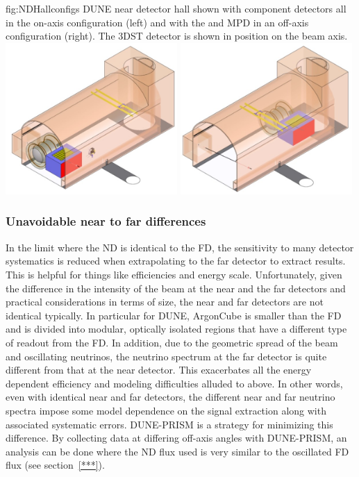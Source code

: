 \begin{dunefigure}{fig:NDHallconfigs}
{DUNE near detector hall shown with component detectors all in the on-axis configuration (left) and with the  and MPD in an off-axis configuration (right). The 3DST detector is shown in position on the beam axis. }
\includegraphics[width=0.49\textwidth]{graphics/NDHall_onaxis.jpg}
\includegraphics[width=0.49\textwidth]{graphics/NDHall_offaxis.jpg}
\end{dunefigure}



\subsubsection{Unavoidable near to far differences}

In the limit where the ND is identical to the FD, the sensitivity to many detector systematics is reduced when extrapolating to the far detector to extract results.  This is helpful for things like efficiencies and energy scale.  Unfortunately, given the difference in the intensity of the beam at the near and the far detectors and practical considerations in terms of size, the near and far detectors are not identical typically.  In particular for DUNE, ArgonCube is smaller than the FD and is divided into modular, optically isolated regions that have a different type of readout from the FD.   In addition, due to the geometric spread of the beam and oscillating neutrinos, the neutrino spectrum at the far detector is quite different from that at the near detector.  This exacerbates all the energy dependent efficiency and modeling difficulties alluded to above. In other words, even with identical near and far detectors, the different near and far neutrino spectra impose some model dependence on the signal extraction along with associated systematic errors.  DUNE-PRISM is a strategy for minimizing this difference. By collecting data at differing off-axis angles with DUNE-PRISM, an analysis can be done where the ND flux used is very similar to the oscillated FD flux (see section~\ref{***}).  

